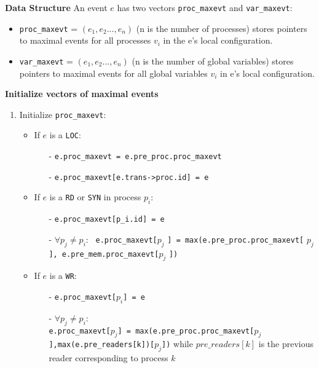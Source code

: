 \documentclass{llncs}
\begin{document}
\noindent
\textbf{Data Structure}
An event $e$ has two vectors \verb!proc_maxevt! and \verb!var_maxevt!:
\begin{itemize}
	\item
	\verb!proc_maxevt! = $(e_1, e_2...,e_n)$ (n is the number of processes) stores pointers to maximal events for all processes $v_i$ in the e's local configuration.
	\item
	\verb!var_maxevt! = $(e_1, e_2...,e_n)$ (n is the number of global variables) stores pointers to maximal events for all global variables $v_i$ in e's local configuration.	
\end{itemize}

\noindent
\textbf{Initialize vectors of maximal events}
\begin{enumerate}
	\item {Initialize \verb!proc_maxevt!:}
	\begin{itemize}
	\item
		If $e$ is a \verb!LOC!:
		\begin{itemize}
		\nonumber
		\item[-]
			\verb!e.proc_maxevt = e.pre_proc.proc_maxevt!
		\item[-]
			\verb!e.proc_maxevt[e.trans->proc.id] = e!		
		\end{itemize}
		
	\item
		If $e$ is a \verb!RD! or \verb!SYN! in process $p_i$: 
		\begin{itemize}
		\item[-]	
			\verb!e.proc_maxevt[p_i.id] = e!
		\item[-]
			$\forall p_j \neq p_i$: 
			\verb! e.proc_maxevt[!$p_j$ \verb!] = max(e.pre_proc.proc_maxevt[! $p_j$ \verb!], e.pre_mem.proc_maxevt[!$p_j$ \verb!])!
	
	\end{itemize}
		
	\item
		If $e$ is a \verb!WR!: 
		\begin{itemize}
		\item[-]		
			\verb!e.proc_maxevt[!$p_i$\verb!] = e!
		\item[-]
			$\forall p_j \neq p_i$: \\
			\verb!e.proc_maxevt[!$p_j$\verb!] = max(e.pre_proc.proc_maxevt[!$p_j$\verb!],max(e.pre_readers[k])[!$p_j$\verb!])!
		while $pre\_readers[k]$ is the previous reader corresponding to process $k$ 
		\end{itemize}
	\end{itemize}
	

\end{enumerate}
\end{document}
